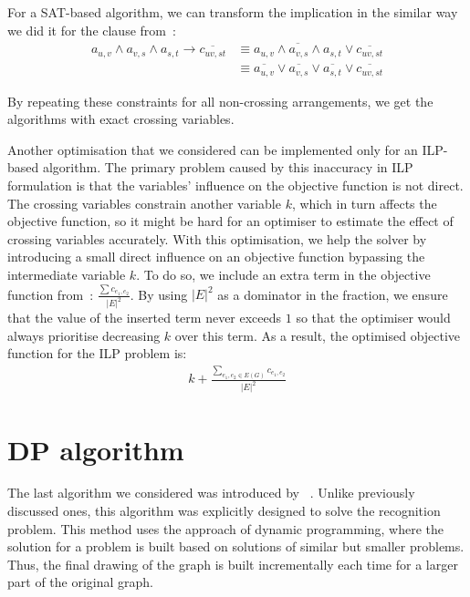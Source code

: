 For a SAT-based algorithm, we can transform the implication in the similar way we did it for the clause from~:
\begin{align*}
    a_{u,v} \land a_{v,s} \land a_{s,t} \rightarrow \overline{c_{uv, st}}
    & \equiv \overline{a_{u,v} \land a_{v,s} \land a_{s,t}} \lor \overline{c_{uv, st}} \\
    & \equiv \overline{a_{u,v}} \lor \overline{a_{v,s}} \lor \overline{a_{s,t}} \lor \overline{c_{uv, st}}
\end{align*}

By repeating these constraints for all non-crossing arrangements, we get the algorithms with exact crossing variables.

Another optimisation that we considered can be implemented only for an ILP-based algorithm. The primary problem caused by this inaccuracy in ILP formulation is that the variables' influence on the objective function is not direct. The crossing variables constrain another variable \(k\), which in turn affects the objective function, so it might be hard for an optimiser to estimate the effect of crossing variables accurately. With this optimisation, we help the solver by introducing a small direct influence on an objective function bypassing the intermediate variable \(k\). To do so, we include an extra term in the objective function from~: \(\frac{\sum c_{e_1, e_2}}{|E|^2}\). By using \(|E|^2\) as a dominator in the fraction, we ensure that the value of the inserted term never exceeds \(1\) so that the optimiser would always prioritise decreasing \(k\) over this term. As a result, the optimised objective function for the ILP problem is:
\begin{gather*}
    k + \frac{\sum_{e_1, e_2 \in E(G)} c_{e_1, e_2}}{|E|^2}
\end{gather*}


\section{DP algorithm}\label{sec:DP-def}

The last algorithm we considered was introduced by \citeauthor{okp}~\cite{okp}. Unlike previously discussed ones, this algorithm was explicitly designed to solve the recognition problem. This method uses the approach of dynamic programming, where the solution for a problem is built based on solutions of similar but smaller problems. Thus, the final drawing of the graph is built incrementally each time for a larger part of the original graph.


